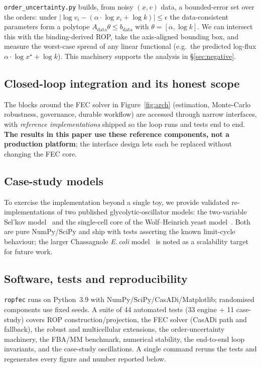\documentclass[11pt]{article}
\begin{document}
\texttt{order\_uncertainty.py} builds, from noisy $(x,v)$ data, a bounded-error
set over the orders: under $|\log v_i - (\alpha\!\cdot\!\log x_i + \log k)| \le
\epsilon$ the data-consistent parameters form a polytope $A_{\mathrm{data}}\theta
\le b_{\mathrm{data}}$ with $\theta=[\alpha,\log k]$. We can intersect this with
the binding-derived ROP, take the axis-aligned bounding box, and measure the
worst-case spread of any linear functional (e.g.\ the predicted log-flux
$\alpha\!\cdot\!\log x^\star + \log k$). This machinery supports the analysis in
\S\ref{sec:negative}.

\subsection{Closed-loop integration and its honest scope}\label{sec:integration}

The blocks around the FEC solver in Figure~\ref{fig:arch} (estimation,
Monte-Carlo robustness, governance, durable workflow) are accessed through narrow
interfaces, with \emph{reference implementations} shipped so the loop runs and
tests end to end. \textbf{The results in this paper use these reference
components, not a production platform}; the interface design lets each be replaced
without changing the FEC core.

\subsection{Case-study models}\label{sec:casestudy}

To exercise the implementation beyond a single toy, we provide validated
re-implementations of two published glycolytic-oscillator models: the
two-variable Sel'kov model~\citep{selkov1968} and the single-cell core of the
Wolf--Heinrich yeast model~\citep{wolf2000}. Both are pure NumPy/SciPy and ship
with tests asserting the known limit-cycle behaviour; the larger Chassagnole
\emph{E.\,coli} model~\citep{chassagnole2002} is noted as a scalability target
for future work.

\subsection{Software, tests and reproducibility}\label{sec:repro}

\texttt{ropfec} runs on Python~3.9 with NumPy/SciPy/CasADi/Matplotlib; randomised
components use fixed seeds. A suite of 44 automated tests (33 engine + 11
case-study) covers ROP construction/projection, the FEC solver (CasADi path and
fallback), the robust and multicellular extensions, the order-uncertainty
machinery, the FBA/MM benchmark, numerical stability, the end-to-end loop
invariants, and the case-study oscillations. A single command reruns the tests
and regenerates every figure and number reported below.
\end{document}

